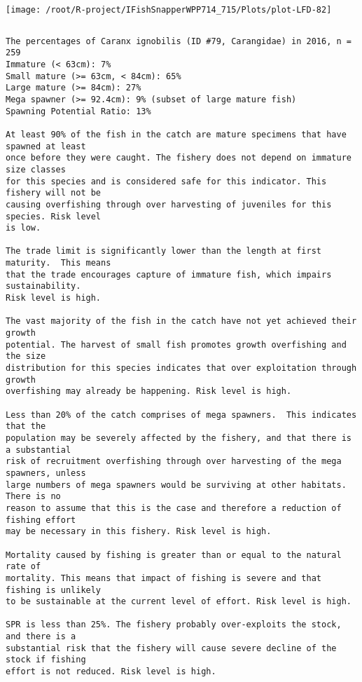 \documentclass{report}\usepackage[]{graphicx}\usepackage[]{color}
\makeatletter
\def\maxwidth{ %
  \ifdim\Gin@nat@width>\linewidth
    \linewidth
  \else
    \Gin@nat@width
  \fi
}
\newenvironment{kframe}{%
 \def\at@end@of@kframe{}%
 \ifinner\ifhmode%
  \def\at@end@of@kframe{\end{minipage}}%
  \begin{minipage}{\columnwidth}%
 \fi\fi%
 \def\FrameCommand##1{\hskip\@totalleftmargin \hskip-\fboxsep
 \colorbox{shadecolor}{##1}\hskip-\fboxsep
     \hskip-\linewidth \hskip-\@totalleftmargin \hskip\columnwidth}%
 \MakeFramed {\advance\hsize-\width
   \@totalleftmargin\z@ \linewidth\hsize
   \@setminipage}}%
 {\par\unskip\endMakeFramed%
 \at@end@of@kframe}
\newenvironment{knitrout}{}{} %
\makeatother
\begin{document}
\begin{knitrout}
\texttt{[image: /root/R-project/IFishSnapperWPP714\_715/Plots/plot-LFD-82]} 
\begin{kframe}\begin{verbatim}
\end{verbatim}
\end{kframe}
\clearpage
\newpage
\begin{kframe}\begin{verbatim}The percentages of Caranx ignobilis (ID #79, Carangidae) in 2016, n = 259
Immature (< 63cm): 7%
Small mature (>= 63cm, < 84cm): 65%
Large mature (>= 84cm): 27%
Mega spawner (>= 92.4cm): 9% (subset of large mature fish)
Spawning Potential Ratio: 13%
 
At least 90% of the fish in the catch are mature specimens that have spawned at least
once before they were caught. The fishery does not depend on immature size classes
for this species and is considered safe for this indicator. This fishery will not be
causing overfishing through over harvesting of juveniles for this species. Risk level
is low.

The trade limit is significantly lower than the length at first maturity.  This means
that the trade encourages capture of immature fish, which impairs sustainability.
Risk level is high.

The vast majority of the fish in the catch have not yet achieved their growth
potential. The harvest of small fish promotes growth overfishing and the size
distribution for this species indicates that over exploitation through growth
overfishing may already be happening. Risk level is high.

Less than 20% of the catch comprises of mega spawners.  This indicates that the
population may be severely affected by the fishery, and that there is a substantial
risk of recruitment overfishing through over harvesting of the mega spawners, unless
large numbers of mega spawners would be surviving at other habitats. There is no
reason to assume that this is the case and therefore a reduction of fishing effort
may be necessary in this fishery. Risk level is high.
 
Mortality caused by fishing is greater than or equal to the natural rate of
mortality. This means that impact of fishing is severe and that fishing is unlikely
to be sustainable at the current level of effort. Risk level is high.
 
SPR is less than 25%. The fishery probably over-exploits the stock, and there is a
substantial risk that the fishery will cause severe decline of the stock if fishing
effort is not reduced. Risk level is high.
 

\end{verbatim}
\end{kframe}
\end{knitrout}
\end{document}
